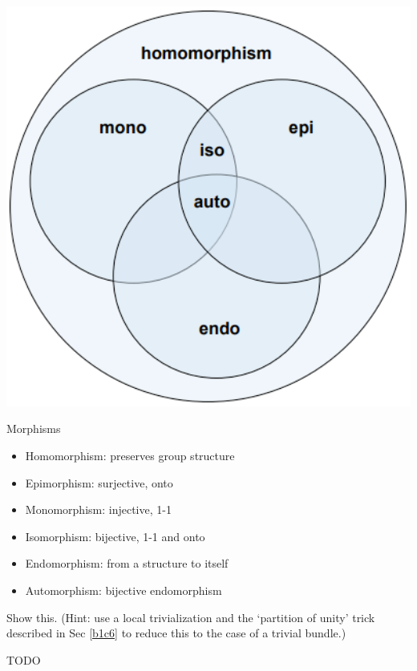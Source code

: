 \documentclass[10pt]{article}
\begin{document}
\begin{marginfigure}
	\begin{center}
	  \includegraphics[width=1.2\textwidth]{figs/morphism.png}
	\end{center}
	\caption{Morphisms}
\end{marginfigure}
\begin{definition}
	\begin{itemize}
		\item Homomorphism: preserves group structure
		\item Epimorphism: surjective, onto
		\item Monomorphism: injective, 1-1
		\item Isomorphism: bijective, 1-1 and onto
		\item Endomorphism: from a structure to itself
		\item Automorphism: bijective endomorphism
	\end{itemize}
\end{definition}


\begin{example}
	Show this. (Hint: use a local trivialization and the `partition of unity' trick described in Sec \ref{b1c6} to reduce this to the case of a trivial bundle.)
\end{example}
\sol TODO
\end{document}
